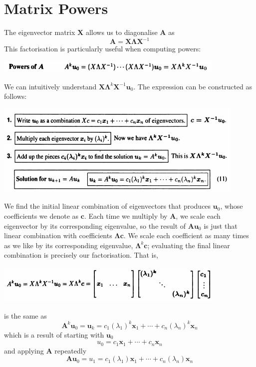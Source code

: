 \documentclass{report}
\begin{document}
\section{Matrix Powers}
The eigenvector matrix $\bm X$ allows us to diagonalise $\bm A$ as
\begin{equation*}
\bm A=\bm{X\Lambda X}^{-1}
\end{equation*}
This factorisation is particularly useful when computing powers:
\begin{center}
\includegraphics[width=11cm]{133}
\end{center}
We can intuitively understand $\bm{X\Lambda}^k\bm X^{-1}\bm u_0$. The expression can be constructed as follows:
\begin{center}
\includegraphics[width=12cm]{134}
\end{center}
We find the initial linear combination of eigenvectors that produces $\bm u_0$, whose coefficients we denote as $\bm c$. 
Each time we multiply by $\bm A$, 
we scale each eigenvector by its corresponding eigenvalue, so the result of $\bm{Au}_0$ is just that linear combination with coefficients 
$\bm\Lambda\bm c$. We scale each coefficient as many times as we like by its corresponding 
eigenvalue, $\bm\Lambda^k\bm c$; evaluating the final linear combination is precisely our factorisation. That is,
\begin{center}
\includegraphics[width=11cm]{135}
\end{center}
is the same as
\begin{equation*}
\bm A^k\bm u_0=\bm u_k=c_1(\lambda_1)^k\bm x_1+\cdots+c_n(\lambda_n)^k\bm x_n
\end{equation*}
which is a result of starting with $\bm u_0$
\begin{equation*}
u_0=c_1\bm x_1+\cdots+c_n\bm x_n
\end{equation*}
and applying $\bm A$ repeatedly
\begin{equation*}
\bm{Au}_0=u_1=c_1(\lambda_1)\bm x_1+\cdots+c_n(\lambda_n)\bm x_n
\end{equation*}
\newpage
\end{document}
